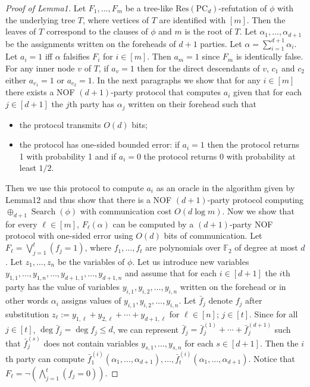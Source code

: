\documentclass[10pt,a4paper]{article}
\begin{document}
\begin{proof}[Proof of Lemma1]
Let $F_1,\ldots,F_m$ be a tree-like $\mathrm{Res}(\mathrm{PC}_d)$-refutation of $\phi$ with the underlying tree $T$, where vertices of $T$ are identified with $[m]$. Then the leaves of $T$ correspond to the clauses of $\phi$ and $m$ is the root of $T$.
Let $\alpha_1,\ldots,\alpha_{d+1}$ be the assignments written on the foreheads of $d+1$ parties. Let $\alpha=\sum_{i=1}^{d+1}\alpha_i$. Let $a_i=1$ iff $\alpha$ falsifies $F_i$ for $i\in[m]$. Then $a_m=1$ since $F_m$ is identically false. For any inner node $v$ of $T$, if $a_v=1$ then for the direct descendants of $v$, $c_1$ and $c_2$ either $a_{c_1}=1$ or $a_{c_2}=1$. In the next paragraphs we show that for any $i\in[m]$ there exists a NOF $(d+1)$-party protocol that computes $a_i$ given that for each $j\in[d+1]$ the $j$th party has $\alpha_j$ written on their forehead such that
\begin{itemize}
\item the protocol transmits $O(d)$ bits;
\item the protocol has one-sided bounded error: if $a_i=1$ then the protocol returns 1 with probability 1 and if $a_i=0$ the protocol returns 0 with probability at least $1/2$.
\end{itemize}
Then we use this protocol to compute $a_i$ as an oracle in the algorithm given by Lemma12 and thus show that there is a NOF $(d+1)$-party protocol computing $\oplus_{d+1}\operatorname{Search}(\phi)$ with communication cost $O(d\log m)$.
Now we show that for every $\ell\in[m]$, $F_\ell(\alpha)$ can be computed by a $(d+1)$-party NOF protocol with one-sided error using $O(d)$ bits of communication. Let $F_\ell=\bigvee_{j=1}^t(f_j=1)$, where $f_1,\ldots,f_t$ are polynomials over $\mathbb F_2$ of degree at most $d$. Let $z_1,\ldots,z_n$ be the variables of $\phi$. Let us introduce new variables $y_{1,1},\ldots,y_{1,n},\ldots,y_{d+1,1},\ldots,y_{d+1,n}$ and assume that for each $i\in[d+1]$ the $i$th party has the value of variables $y_{i,1},y_{i,2},\ldots,y_{i,n}$ written on the forehead or in other words $\alpha_i$ assigns values of $y_{i,1},y_{i,2},\ldots,y_{i,n}$. Let $\bar f_j$ denote $f_j$ after substitution $z_\ell:=y_{1,\ell}+y_{2,\ell}+\cdots+y_{d+1,\ell}$ for $\ell\in[n]$; $j\in[t]$. Since for all $j\in[t]$, $\deg\bar f_j=\deg f_j\le d$, we can represent $\bar f_j=\bar f_j^{(1)}+\cdots+\bar f_j^{(d+1)}$ such that $\bar f_j^{(s)}$ does not contain variables $y_{s,1},\ldots,y_{s,n}$ for each $s\in[d+1]$. Then the $i$th party can compute $\bar f_1^{(i)}(\alpha_1,\ldots,\alpha_{d+1}),\ldots,\bar f_t^{(i)}(\alpha_1,\ldots,\alpha_{d+1})$. Notice that $F_\ell=\neg(\bigwedge_{j=1}^t(f_j=0))$.

\end{proof}
\end{document}
